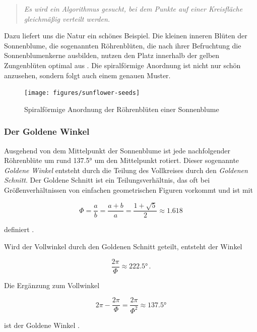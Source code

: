 \begin{quote}
  \textit{Es wird ein Algorithmus gesucht, bei dem Punkte auf einer Kreisfläche gleichmäßig verteilt werden.}
\end{quote}

Dazu liefert uns die Natur ein schönes Beispiel. Die kleinen inneren Blüten der Sonnenblume, die sogenannten Röhrenblüten, die nach ihrer Befruchtung die Sonnenblumenkerne ausbilden, nutzen den Platz innerhalb der gelben Zungenblüten optimal aus \cite{zimmermann2017sonnenblume}. Die spiralförmige Anordnung ist nicht nur schön anzusehen, sondern folgt auch einem genauen Muster.

\begin{figure}[htb]
  \texttt{[image: figures/sunflower-seeds]}
  \caption{Spiralförmige Anordnung der Röhrenblüten einer Sonnenblume \cite{blender2017howto}}
  \label{fig:sunflower-seeds}
\end{figure}

\subsubsection*{Der Goldene Winkel}
Ausgehend von dem Mittelpunkt der Sonnenblume ist jede nachfolgender Röhrenblüte um rund \ang{137.5} um den Mittelpunkt rotiert. Dieser sogenannte \textit{Goldene Winkel} entsteht durch die Teilung des Vollkreises durch den \textit{Goldenen Schnitt}. Der Goldene Schnitt ist ein Teilungsverhältnis, das oft bei Größenverhältnissen von einfachen geometrischen Figuren vorkommt und ist mit

\begin{equation}
  \Phi = \frac{a}{b} = \frac{a + b}{a} = \frac{1 + \sqrt{5}}{2} \approx 1.618
\end{equation}

\noindent definiert \cite{wolfram2017golden}.

Wird der Vollwinkel durch den Goldenen Schnitt geteilt, entsteht der Winkel

\begin{equation}
  \frac{2\pi}{\Phi} \approx \ang{222.5} \,.
\end{equation}

Die Ergänzung zum Vollwinkel

\begin{equation}
  2\pi - \frac{2\pi}{\Phi} = \frac{2\pi}{\Phi^2} \approx \ang{137.5}
\end{equation}

\noindent ist der Goldene Winkel \cite{wolfram2017golden}.

